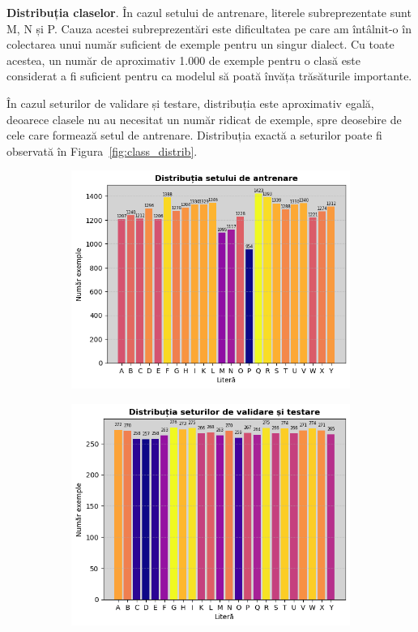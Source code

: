 \textbf{Distribuția claselor}. În cazul setului de antrenare, literele subreprezentate sunt M, N și P. Cauza acestei subreprezentări este dificultatea pe care am întâlnit-o în colectarea unui număr suficient de exemple pentru un singur dialect. Cu toate acestea, un număr de aproximativ 1.000 de exemple pentru o clasă este considerat a fi suficient pentru ca modelul să poată învăța trăsăturile importante.

În cazul seturilor de validare și testare, distribuția este aproximativ egală, deoarece clasele nu au necesitat un număr ridicat de exemple, spre deosebire de cele care formează setul de antrenare. Distribuția exactă a seturilor poate fi observată în Figura~\ref{fig:class_distrib}.

\begin{figure}[H]
  \centering
  \begin{subfigure}{0.49\textwidth}
    \centering
    \includegraphics[width=\linewidth]{images/2-recunoasterea-asl/train_classes_distrib.png}
    \caption{}
  \end{subfigure}
  \begin{subfigure}{0.49\textwidth}
    \centering
    \includegraphics[width=\linewidth]{images/2-recunoasterea-asl/test_val_classes_distrib.png}

\end{subfigure}
\end{figure}
